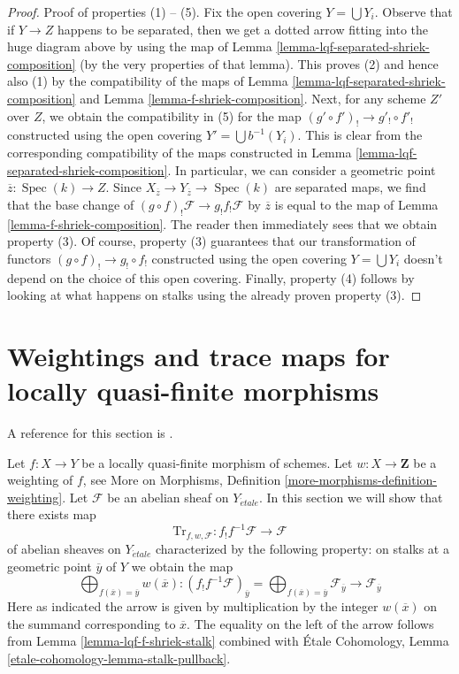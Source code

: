 \documentclass{stacks-project}
\theoremstyle{plain}
\theoremstyle{definition}
\theoremstyle{remark}
\numberwithin{equation}{subsection}
\def\Spec{\mathop{\mathrm{Spec}}}
\def\etale{{\acute{e}tale}}
\begin{document}
\begin{proof}
\medskip\noindent
Proof of properties (1) -- (5). Fix the open covering $Y = \bigcup Y_i$.
Observe that if $Y \to Z$ happens to be separated, then we get a dotted
arrow fitting into the huge diagram above by using the map of
Lemma \ref{lemma-lqf-separated-shriek-composition}
(by the very properties of that lemma).
This proves (2) and hence also (1) by the compatibility of the
maps of Lemma \ref{lemma-lqf-separated-shriek-composition}
and Lemma \ref{lemma-f-shriek-composition}.
Next, for any scheme $Z'$ over $Z$, we obtain the compatibility in (5)
for the map $(g' \circ f')_! \to g'_! \circ f'_!$
constructed using the open covering $Y' = \bigcup b^{-1}(Y_i)$.
This is clear from the corresponding compatibility of the maps
constructed in Lemma \ref{lemma-lqf-separated-shriek-composition}.
In particular, we can consider a geometric point
$\overline{z} : \Spec(k) \to Z$. Since
$X_{\overline{z}} \to Y_{\overline{z}} \to \Spec(k)$
are separated maps, we find that the base change of
$(g \circ f)_!\mathcal{F} \to g_! f_! \mathcal{F}$
by $\overline{z}$ is equal to the map of
Lemma \ref{lemma-f-shriek-composition}.
The reader then immediately sees that we obtain property (3).
Of course, property (3) guarantees that our transformation of functors
$(g \circ f)_! \to g_! \circ f_!$ constructed using the open covering
$Y = \bigcup Y_i$ doesn't depend on the choice of this open covering.
Finally, property (4) follows by looking at what happens on stalks
using the already proven property (3).
\end{proof}








\section{Weightings and trace maps for locally quasi-finite morphisms}
\label{section-weightings}

\noindent
A reference for this section is
\cite[Exposee XVII, Proposition 6.2.5]{SGA4}.

\medskip\noindent
Let $f : X \to Y$ be a locally quasi-finite morphism of schemes.
Let $w : X \to \mathbf{Z}$ be a weighting of $f$, see
More on Morphisms, Definition \ref{more-morphisms-definition-weighting}.
Let $\mathcal{F}$ be an abelian sheaf on $Y_\etale$.
In this section we will show that there exists map
$$
\text{Tr}_{f, w, \mathcal{F}} :
f_!f^{-1}\mathcal{F}
\longrightarrow
\mathcal{F}
$$
of abelian sheaves on $Y_\etale$ characterized by the following property:
on stalks at a geometric point $\overline{y}$ of $Y$ we obtain the map
$$
\bigoplus\nolimits_{f(\overline{x}) = \overline{y}} w(\overline{x}) :
(f_!f^{-1}\mathcal{F})_{\overline{y}} =
\bigoplus\nolimits_{f(\overline{x}) = \overline{y}}
\mathcal{F}_{\overline{y}}
\longrightarrow
\mathcal{F}_{\overline{y}}
$$
Here as indicated the arrow is given by multiplication by the integer
$w(\overline{x})$ on the summand corresponding to $\overline{x}$.
The equality on the left of the arrow follows from
Lemma \ref{lemma-lqf-f-shriek-stalk} combined with
\'Etale Cohomology, Lemma \ref{etale-cohomology-lemma-stalk-pullback}.
\end{document}
